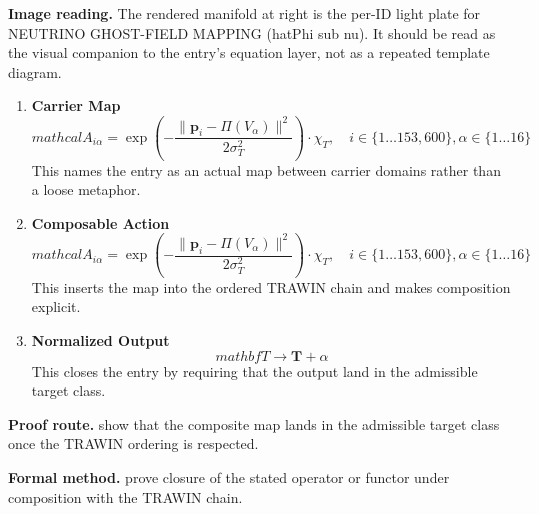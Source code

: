 \begin{samepage}
\noindent\begin{minipage}[t]{0.45\linewidth}
\vspace{0pt}
\raggedright
\scriptsize\textbf{Image reading.} The rendered manifold at right is the per-ID light plate for NEUTRINO GHOST-FIELD MAPPING (hatPhi sub nu). It should be read as the visual companion to the entry's equation layer, not as a repeated template diagram.\par
\end{minipage}\hfill
\begin{minipage}[t]{0.53\linewidth}
\vspace*{-0.10in}
\raggedright
{}
\end{minipage}
\end{samepage}

\clearpage


\begin{enumerate}[leftmargin=1.6em,itemsep=9pt,topsep=6pt]
\item \textbf{Carrier Map}
\[
mathcal{A}_{i \alpha} = \exp\left( -\frac{\|\mathbf{p}_i - \Pi(V_\alpha)\|^2}{2\sigma_T^2} \right) \cdot \chi_T, \quad i \in \{1 \dots 153,600\}, \alpha \in \{1 \dots 16\}
\]
This names the entry as an actual map between carrier domains rather than a loose metaphor.

\item \textbf{Composable Action}
\[
mathcal{A}_{i \alpha} = \exp\left( -\frac{\|\mathbf{p}_i - \Pi(V_\alpha)\|^2}{2\sigma_T^2} \right) \cdot \chi_T, \quad i \in \{1 \dots 153,600\}, \alpha \in \{1 \dots 16\}
\]
This inserts the map into the ordered TRAWIN chain and makes composition explicit.

\item \textbf{Normalized Output}
\[
mathbf{T}\to \mathbf{T} + \alpha
\]
This closes the entry by requiring that the output land in the admissible target class.
\end{enumerate}

\textbf{Proof route.} show that the composite map lands in the admissible target class once the TRAWIN ordering is respected.

\textbf{Formal method.} prove closure of the stated operator or functor under composition with the TRAWIN chain.

